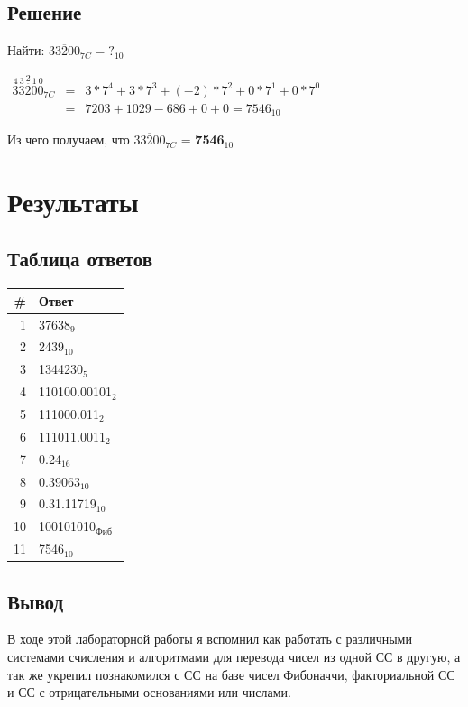 \documentclass[11pt]{article}
\begin{document}
\subsection{Решение}
\label{sec:org076ccdc}
Найти: \(33\overline{2}00_{7C} = ?_{10}\) \\
\begin{center}
\(\begin{array}{lcl}
\overset{4}{3}\overset{3}{3}\overset{\underline{2}}{2}\overset{1}{0}\overset{0}{0}_{7C}
& = & 3 * 7^4 + 3 * 7^3 + (-2) * 7^2 + 0 * 7^1 + 0 * 7^0 \\
& = & 7203 + 1029 - 686 + 0 + 0 = 7546_{10}
\end{array}\)
\end{center}

Из чего получаем, что \(33\overline{2}00_{7C}\) = \textbf{7546\(_{\text{10}}\)}

\section{Результаты}
\label{sec:org3461907}
\subsection{Таблица ответов}
\label{sec:org25e4ab5}
\begin{center}
\begin{tabular}{|r|l|}
\hline
\# & Ответ\\
\hline
1 & 37638\(_{\text{9}}\)\\
\hline
2 & 2439\(_{\text{10}}\)\\
\hline
3 & 1344230\(_{\text{5}}\)\\
\hline
4 & 110100.00101\(_{\text{2}}\)\\
\hline
5 & 111000.011\(_{\text{2}}\)\\
\hline
6 & 111011.0011\(_{\text{2}}\)\\
\hline
7 & 0.24\(_{\text{16}}\)\\
\hline
8 & 0.39063\(_{\text{10}}\)\\
\hline
9 & 0.31.11719\(_{\text{10}}\)\\
\hline
10 & 100101010\(_{\text{Фиб}}\)\\
\hline
11 & 7546\(_{\text{10}}\)\\
\hline
\end{tabular}
\end{center}

\subsection{Вывод}
\label{sec:org078655f}
В ходе этой лабораторной работы я вспомнил как работать с различными системами
счисления и алгоритмами для перевода чисел из одной СС в другую, а так же
укрепил познакомился с СС на базе чисел Фибоначчи, факториальной СС и
СС с отрицательными основаниями или числами.
\end{document}
